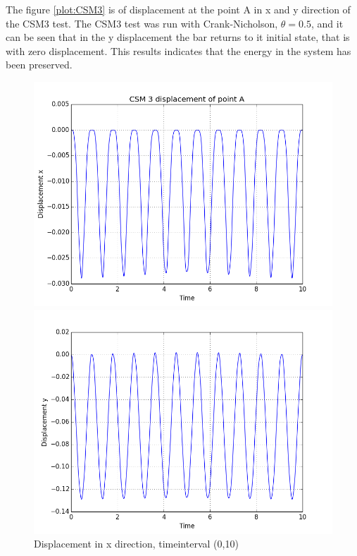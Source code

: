 The figure \ref{plot:CSM3} is of displacement at the point A in x and y direction of the CSM3 test. The CSM3 test was run with Crank-Nicholson, $\theta = 0.5$, and it can be seen that in the y displacement the bar returns to it initial state, that is with zero displacement. This results indicates that the energy in the system has been preserved.

\begin{figure}[H]  
\centering
  \begin{minipage}[b]{0.60\linewidth}
    \centering
    \includegraphics[width=0.9\linewidth,trim={2mm 2mm 5mm 5mm},clip]{./Verification_Validation//Hron_Turek/dis_x.png} 
    \caption{Displacement in x direction, timeinterval (0,10)} 
    \vspace{4ex}
  \end{minipage}%
  \begin{minipage}[b]{0.60\linewidth}
    \centering
    \includegraphics[width=0.9\linewidth,trim={2mm 2mm 5mm 5mm},clip]{./Verification_Validation//Hron_Turek/dis_y.png} 

\end{minipage}
\end{figure}
